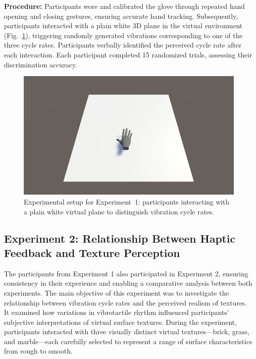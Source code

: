 \textbf{Procedure:} Participants wore and calibrated the glove through repeated hand opening and closing gestures, ensuring accurate hand tracking. Subsequently, participants interacted with a plain white 3D plane in the virtual environment (Fig.~\ref{fig:experiment1_setup}), triggering randomly generated vibrations corresponding to one of the three cycle rates. Participants verbally identified the perceived cycle rate after each interaction. Each participant completed 15 randomized trials, assessing their discrimination accuracy.

\begin{figure}[H]\centering
	\includegraphics[width=1\textwidth]{Pictures/ex1.png}%
	\caption{Experimental setup for Experiment~1: participants interacting with a plain white virtual plane to distinguish vibration cycle rates.}\label{fig:experiment1_setup}%
	
\end{figure}

\newpage
\subsection{Experiment 2: Relationship Between Haptic Feedback and Texture Perception}
The participants from Experiment 1 also participated in Experiment 2, ensuring consistency in their experience and enabling a comparative analysis between both experiments. The main objective of this experiment was to investigate the relationship between vibration cycle rates and the perceived realism of textures. It examined how variations in vibrotactile rhythm influenced participants’ subjective interpretations of virtual surface textures. During the experiment, participants interacted with three visually distinct virtual textures—brick, grass, and marble—each carefully selected to represent a range of surface characteristics from rough to smooth.

